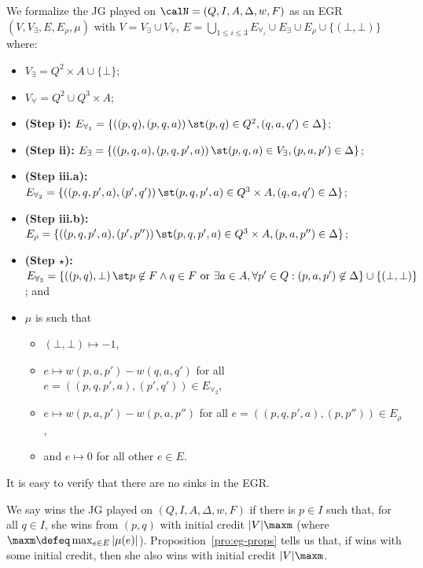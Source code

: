 \documentclass[a4paper]{article}
\begin{document}
We formalize the JG played on $\calN = (Q,I,A,\Delta,w,F)$ as an EGR
$(V,V_\exists,E,E_\rho,\mu)$ with $V = V_\exists \cup V_\forall$, $E =
\bigcup_{1 \le i \le 3} E_{\forall_i} \cup E_\exists \cup E_\rho \cup
\{(\bot,\bot)\}$ where:
\begin{itemize}[nolistsep]
	\item $V_\exists = Q^2 \times A \cup \{\bot\}$;
	\item $V_\forall = Q^2 \cup Q^3 \times A$;
	\item \textbf{(Step i):} $E_{\forall_1} = \{ \left( (p,q), (p,q,a)
		\right) \st (p,q) \in Q^2, (q,a,q') \in \Delta\}$;
	\item \textbf{(Step ii):} $E_\exists = \{ \left( (p,q,a), (p,q,p',a)
		\right) \st (p,q,a) \in V_\exists, (p,a,p') \in \Delta \}$;
	\item \textbf{(Step iii.a):} $E_{\forall_2} = \{ \left( (p,q,p',a),
		(p',q') \right) \st (p,q,p',a) \in Q^3 \times A, (q,a,q') \in
		\Delta \}$;
	\item \textbf{(Step iii.b):} $E_\rho = \{ \left( (p,q,p',a), (p',p'')
		\right) \st (p,q,p',a) \in Q^3 \times A, (p,a,p'') \in \Delta
		\}$;
	\item \textbf{(Step $\star$):} $E_{\forall_3} = \{ \left( (p,q), \bot
		\right) \st p \not\in F \land q \in F \text{ or } \exists a \in
		A, \forall p' \in Q : (p,a,p') \not\in \Delta \}
		\cup \{(\bot,\bot)\}$; and
	\item $\mu$ is such that
		\begin{itemize}[nolistsep]
			\item $(\bot,\bot) \mapsto -1$,
			\item $e \mapsto w(p,a,p') - w(q,a,q')$ for all $e =
				\left( (p,q,p',a), (p',q') \right) \in
				E_{\forall_2}$,
			\item $e \mapsto w(p,a,p') - w(p,a,p'')$ for all $e
				= \left( (p,q,p',a) ,(p,p'') \right) \in
				E_{\rho}$,
			\item and $e \mapsto 0$ for all other $e \in E$.
		\end{itemize}
\end{itemize}
It is easy to verify that there are no sinks in the EGR.

We say \eve wins the JG played on $(Q,I,A,\Delta,w,F)$ if there is $p \in I$ such
that, for all $q \in I$, she wins from $(p,q)$ with initial credit
$|V|\maxm$ (where $\maxm \defeq \max_{e \in E} |\mu(e)|$).
Proposition~\ref{pro:eg-props} tells us that, if \eve wins with some initial
credit, then she also wins with initial credit $|V|\maxm$.
\end{document}
